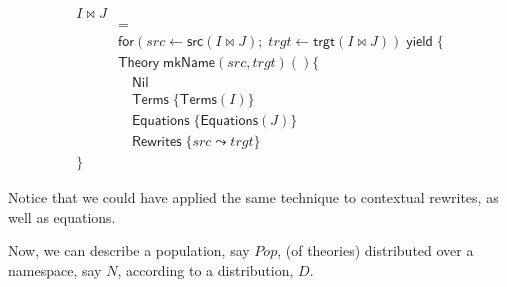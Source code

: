 \documentclass{article}
\begin{document}
\begin{align}
  I \Join J \\
  & = \\
  & \mathsf{for}( src \leftarrow \mathsf{src}( I \Join J ); \; trgt \leftarrow \mathsf{trgt}( I \Join J ) ) \; \mathsf{yield}\; \{ \\
  & \mathsf{Theory}\; \mathsf{mkName}( src, trgt )() \{ \\
       & \quad \mathsf{Nil} \\
    & \quad \mathsf{Terms}\; \{ \mathsf{Terms}( I ) \} \\
    & \quad \mathsf{Equations}\; \{ \mathsf{Equations}( J ) \} \\
    & \quad \mathsf{Rewrites}\; \{ src \leadsto trgt \} \\
  \}
\end{align}

Notice that we could have applied the same technique to contextual rewrites,
as well as equations.

Now, we can describe a population, say $Pop$, (of theories) distributed over a
namespace, say $N$, according to a distribution, $D$.
\end{document}
